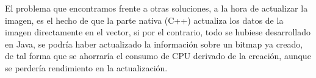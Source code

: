 El problema que encontramos frente a otras soluciones, a la hora de actualizar la imagen, es el hecho de que la parte nativa (C++) actualiza los datos de la imagen directamente en el vector, si por el contrario, todo se hubiese desarrollado en Java, se podría haber actualizado la información sobre un bitmap ya creado, de tal forma que se ahorraría el consumo de CPU derivado de la creación, aunque se perdería rendimiento en la actualización.\\ 

